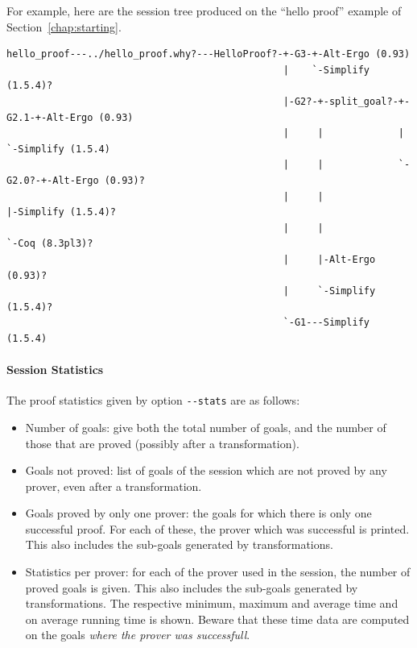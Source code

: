 For example, here are the session tree produced on the ``hello
proof'' example of Section~\ref{chap:starting}.
{\scriptsize
\begin{verbatim}
hello_proof---../hello_proof.why?---HelloProof?-+-G3-+-Alt-Ergo (0.93)
                                                |    `-Simplify (1.5.4)?
                                                |-G2?-+-split_goal?-+-G2.1-+-Alt-Ergo (0.93)
                                                |     |             |      `-Simplify (1.5.4)
                                                |     |             `-G2.0?-+-Alt-Ergo (0.93)?
                                                |     |                     |-Simplify (1.5.4)?
                                                |     |                     `-Coq (8.3pl3)?
                                                |     |-Alt-Ergo (0.93)?
                                                |     `-Simplify (1.5.4)?
                                                `-G1---Simplify (1.5.4)
\end{verbatim}
}

\paragraph{Session Statistics}

The proof statistics given by option \verb|--stats| are as follows:
\begin{itemize}
\item Number of goals: give both the total number of goals, and the
  number of those that are proved (possibly after a transformation).
\item Goals not proved: list of goals of the session which are not
  proved by any prover, even after a transformation.
\item Goals proved by only one prover: the goals for which there is only
  one successful proof. For each of these, the prover which was
  successful is printed. This also includes the sub-goals generated by
  transformations.
\item Statistics per prover: for each of the prover used in the
  session, the number of proved goals is given. This also includes the
  sub-goals generated by transformations. The respective minimum,
  maximum and average time and on average running time is
  shown. Beware that these time data are computed on the
  goals \emph{where the prover was successfull}.
\end{itemize}

